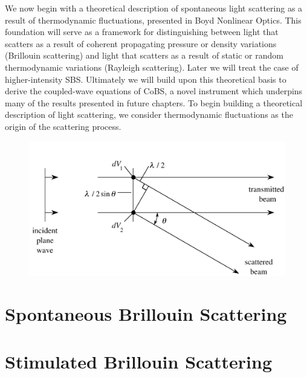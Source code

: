 We now begin with a theoretical description of spontaneous light scattering as a result of thermodynamic fluctuations, presented in Boyd Nonlinear Optics.\cite{boyd2020nonlinear} This foundation will serve as a framework for distinguishing between light that scatters as a result of coherent propagating pressure or density variations (Brillouin scattering) and light that scatters as a result of static or random thermodynamic variations (Rayleigh scattering). Later we will treat the case of higher-intensity \ac{SBS}. Ultimately we will build upon this theoretical basis to derive the coupled-wave equations of \ac{CoBS}, a novel instrument which underpins many of the results presented in future chapters. To begin building a theoretical description of light scattering, we consider thermodynamic fluctuations as the origin of the scattering process.



\begin{figure}[t] %
\centering
\includegraphics[width=\textwidth]{figs/1-Intro/Boyd homogeneous material no scatter.png}
\caption{}
\label{fig:Introduction:homogeneous-material-no-scatter}
\end{figure}

\section{Spontaneous Brillouin Scattering}
\label{sec:Introduction:Spontaneous-Brillouin}


\section{Stimulated Brillouin Scattering}
\label{sec:Introduction:Stimulated}



